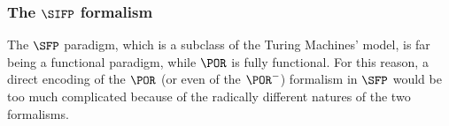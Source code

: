\begin{comment}
\item In the case of iteration, by IH we know that $\exists p_g \in \POLY.\forall q_g \in \POLY. p_q \lesssim q_g \to g(\vone_1, \ldots, \vone_k, \oone)= g'(\vone_1, \ldots, \vone_k, \oone_{q_g(|\vone_1|, \ldots, |\vone_k|)})$ with $g' \in \POR^-$ is bounded by a polynomial $p_g$ in its inputs. Similarly, we know that $\exists p_0, p_1 \in \POLY.\forall q_0, q_1 \in \POLY. p_0 \lesssim q_0 \land p_1 \lesssim q_1 \to h_0(\vone_1, \ldots, \vone_k, \vone_{k+1}, \oone)= h_0'(\vone_1, \ldots, \vone_k, \vone_{k+1}, \oone_{q_0(|\vone_1|, \ldots, |\vone_k|, |\vone_{k+1}|)}) \land h_1(\vone_1, \ldots, \vone_k,  \vone_{k+1}, \oone)= h_1'(\vone_1, \ldots, \vone_k,\vone_{k+1},  \oone_{p_1(|\vone_1|, \ldots, |\vone_k|, |\vone_{k+1}|)})$. Similarly to what we did previously, we use lemma \ref{lemma:sizeofpor} in order to obtain an upper bound to the size of the recursive call that allows us to express $p_0$ and $p_1$ in function of $\vone_1, \ldots, \vone_k$. Call the polynomials that we obtain $p_0'$ and $p_1'$. now we can produce an polynomial universally greater that the one that we obtained simply applying \ref{lemma:greaterpoly}, obtaining $p$. This allows us to use all the IHs and to conclude the sub-derivation.
\end{itemize}
\end{proof}

At this point, the proof of final result is intuitively concluded. The $\POR^-$ formalism coincides to the Ferreira's $\BRS$ (Ferreira90). The authors of the above mentioned paper claimed such formalism to be polynomially interpretable by a single tape Turing's Machine, which is a particular class of a $\SFP$ machine. Unfortunately, as far as the authors of this paper know, the proof of such result is unavailable.

For this reason, and for the sake of producing a comprehensive and self-contained work, we decided to prove explicitly that the $\POR^-$ formalism can be interpreted by a single tape Turing's Machine with polynomial complexity.
\end{comment}

\subsubsection{The $\SIFP$ formalism}

The $\SFP$ paradigm, which is a subclass of the Turing Machines' model, is far being a functional paradigm, while $\POR$ is fully functional. For this reason, a direct encoding of the $\POR$ (or even of the $\POR^-$) formalism in $\SFP$ would be too much complicated because of the radically different natures of the two formalisms.

